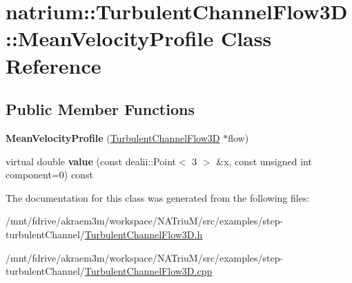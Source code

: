 \hypertarget{classnatrium_1_1TurbulentChannelFlow3D_1_1MeanVelocityProfile}{
\section{natrium::TurbulentChannelFlow3D::MeanVelocityProfile Class Reference}
\label{classnatrium_1_1TurbulentChannelFlow3D_1_1MeanVelocityProfile}
}
\subsection*{Public Member Functions}
\begin{DoxyCompactItemize}
\item 
\hypertarget{classnatrium_1_1TurbulentChannelFlow3D_1_1MeanVelocityProfile_a00267bd7117c08d5e4c5bbfbb58821fb}{
{\bfseries MeanVelocityProfile} (\hyperlink{classnatrium_1_1TurbulentChannelFlow3D}{TurbulentChannelFlow3D} $\ast$flow)}
\label{classnatrium_1_1TurbulentChannelFlow3D_1_1MeanVelocityProfile_a00267bd7117c08d5e4c5bbfbb58821fb}

\item 
\hypertarget{classnatrium_1_1TurbulentChannelFlow3D_1_1MeanVelocityProfile_a6eb051f2b245bf6594b2b5935b3808f9}{
virtual double {\bfseries value} (const dealii::Point$<$ 3 $>$ \&x, const unsigned int component=0) const }
\label{classnatrium_1_1TurbulentChannelFlow3D_1_1MeanVelocityProfile_a6eb051f2b245bf6594b2b5935b3808f9}

\end{DoxyCompactItemize}


The documentation for this class was generated from the following files:\begin{DoxyCompactItemize}
\item 
/mnt/fdrive/akraem3m/workspace/NATriuM/src/examples/step-\/turbulentChannel/\hyperlink{TurbulentChannelFlow3D_8h}{TurbulentChannelFlow3D.h}\item 
/mnt/fdrive/akraem3m/workspace/NATriuM/src/examples/step-\/turbulentChannel/\hyperlink{TurbulentChannelFlow3D_8cpp}{TurbulentChannelFlow3D.cpp}\end{DoxyCompactItemize}
